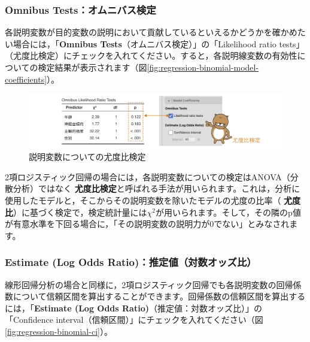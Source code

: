 \documentclass[
  12pt,
  a5jpaper,
  lualatex, ja=standard]{bxjsbook}
\renewcommand{\emph}[1]{\textbf{\color{emph} #1}}
\begin{document}
\hypertarget{omnibus-testsux30aaux30e0ux30cbux30d0ux30b9ux691cux5b9a}{%
\subsubsection*{Omnibus Tests：オムニバス検定}\label{omnibus-testsux30aaux30e0ux30cbux30d0ux30b9ux691cux5b9a}}

各説明変数が目的変数の説明において貢献しているといえるかどうかを確かめたい場合には，「\textbf{Omnibus Tests}（オムニバス検定）」の「Likelihood ratio tests」（尤度比検定）にチェックを入れてください。すると，各説明線変数の有効性についての検定結果が表示されます（図\ref{fig:regression-binomial-model-coefficients}）。

\begin{figure}[!ht]

{\centering \includegraphics[width=1\linewidth]{images/regression/binomial-omnibus} 

}

\caption{説明変数についての尤度比検定}\label{fig:regression-binomial-omnibus}
\end{figure}

2項ロジスティック回帰の場合には，各説明変数についての検定はANOVA（分散分析）ではなく\emph{尤度比検定}と呼ばれる手法が用いられます。これは，分析に使用したモデルと，そこからその説明変数を除いたモデルの尤度の比率（\emph{尤度比}）に基づく検定で，検定統計量には\(\chi^{2}\)が用いられます。そして，その隣のp値が有意水準を下回る場合に，「その説明変数の説明力が0でない」とみなされます。

\hypertarget{estimate-log-odds-ratioux63a8ux5b9aux5024ux5bfeux6570ux30aaux30c3ux30baux6bd4}{%
\subsubsection*{Estimate (Log Odds Ratio)：推定値（対数オッズ比）}\label{estimate-log-odds-ratioux63a8ux5b9aux5024ux5bfeux6570ux30aaux30c3ux30baux6bd4}}

線形回帰分析の場合と同様に，2項ロジスティック回帰でも各説明変数の回帰係数について信頼区間を算出することができます。回帰係数の信頼区間を算出するには，「\textbf{Estimate (Log Odds Ratio)}（推定値：対数オッズ比）」の「Confidence interval（信頼区間）」にチェックを入れてください（図\ref{fig:regression-binomial-ci}）。
\end{document}
